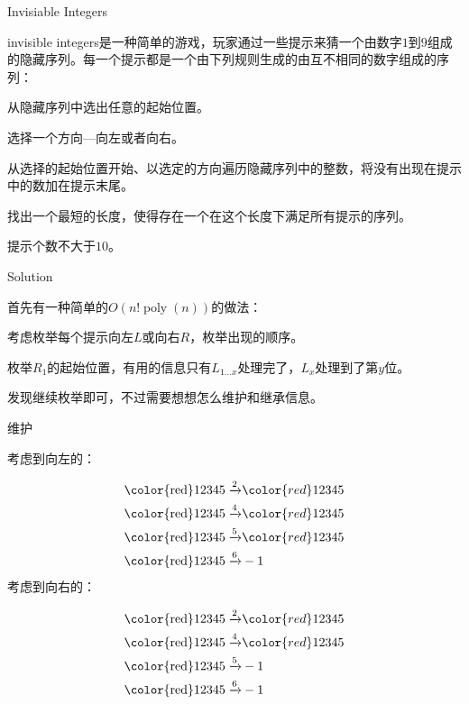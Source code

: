 \documentclass[10pt]{beamer}
\begin{document}
	\clearpage
	\begin{frame}{Invisiable Integers}

		invisible integers是一种简单的游戏，玩家通过一些提示来猜一个由数字$1$到$9$组成的隐藏序列。每一个提示都是一个由下列规则生成的由互不相同的数字组成的序列：

		从隐藏序列中选出任意的起始位置。

		选择一个方向---向左或者向右。

		从选择的起始位置开始、以选定的方向遍历隐藏序列中的整数，将没有出现在提示中的数加在提示末尾。

		找出一个最短的长度，使得存在一个在这个长度下满足所有提示的序列。

		提示个数不大于$10$。
	\end{frame}
	\clearpage
	\begin{frame}{Solution}
	
		首先有一种简单的$O(n!\operatorname{poly}(n))$的做法：

		考虑枚举每个提示向左$L$或向右$R$，枚举出现的顺序。

		枚举$R_1$的起始位置，有用的信息只有$L_{1\dots x}$处理完了，$L_x$处理到了第$y$位。

		发现继续枚举即可，不过需要想想怎么维护和继承信息。
	\end{frame}
	\clearpage
	\begin{frame}{维护}

		考虑到向左的：
	
		$$
		\begin{aligned}
		\rm{\color{red}123}45\xrightarrow{2}&{\color{red}12}345\\
		\rm{\color{red}123}45\xrightarrow{4}&{\color{red}1234}5\\
		\rm{\color{red}123}45\xrightarrow{5}&{\color{red}123}45\\
		\rm{\color{red}123}45\xrightarrow{6}&-1\\
		\end{aligned}
		$$
		考虑到向右的：
	
		$$
		\begin{aligned}
		\rm{\color{red}123}45\xrightarrow{2}&{\color{red}123}45\\
		\rm{\color{red}123}45\xrightarrow{4}&{\color{red}1234}5\\
		\rm{\color{red}123}45\xrightarrow{5}&-1\\
		\rm{\color{red}123}45\xrightarrow{6}&-1\\
		\end{aligned}
		$$
	
	\end{frame}
\end{document}
